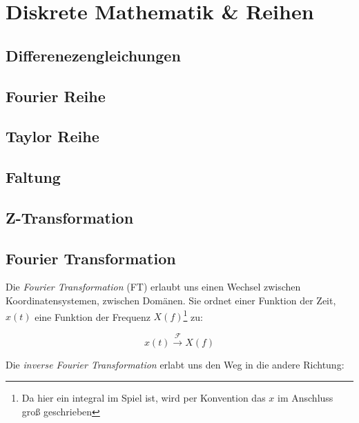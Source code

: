 \chapter{Diskrete Mathematik \& Reihen}

\section{Differenezengleichungen}



\section{Fourier Reihe}

\section{Taylor Reihe}

\section{Faltung}

\section{Z-Transformation}

\section{Fourier Transformation}

Die \emph{Fourier Transformation} (FT) erlaubt uns einen Wechsel zwischen Koordinatensystemen, zwischen Domänen. Sie ordnet einer Funktion der Zeit, $x(t)$ eine Funktion der Frequenz $X(f)$\footnote{Da hier ein integral im Spiel ist, wird per Konvention das $x$ im Anschluss groß geschrieben} zu:

\begin{equation}
x(t) {\stackrel {\mathcal {F}}{\longrightarrow }} X(f)
\end{equation}
 
Die \emph{inverse Fourier Transformation} erlabt uns den Weg in die andere Richtung:

